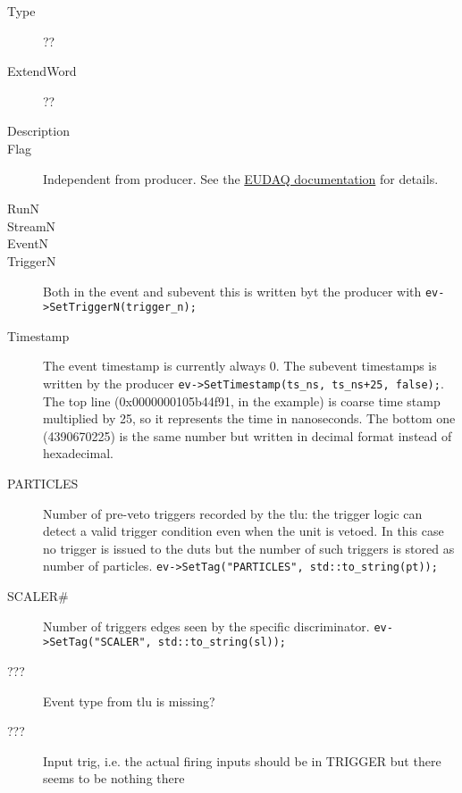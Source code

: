 \begin{description}
  \item[Type] ??
  \item[ExtendWord] ??
  \item[Description]
  \item[Flag] Independent from producer. See the \href{https://github.com/eudaq/eudaq/blob/master/main/lib/core/include/eudaq/Event.hh#L87}{EUDAQ documentation} for details.
  \item[RunN]
  \item[StreamN]
  \item[EventN]
  \item[TriggerN] Both in the event and subevent this is written byt the producer with \verb|ev->SetTriggerN(trigger_n);|
  \item[Timestamp] The event timestamp is currently always 0. The subevent timestamps is written by the producer \verb|ev->SetTimestamp(ts_ns, ts_ns+25, false);|. The top line (0x0000000105b44f91, in the example) is coarse time stamp multiplied by 25, so it represents the time in nanoseconds. The bottom one (4390670225) is the same number but written in decimal format instead of hexadecimal.
  \item[PARTICLES] Number of pre-veto triggers recorded by the \gls{tlu}: the trigger logic can detect a valid trigger condition even when the unit is vetoed. In this case no trigger is issued to the \gls{dut}s but the number of such triggers is stored as number of particles. \verb|ev->SetTag("PARTICLES", std::to_string(pt));|
  \item[SCALER\#] Number of triggers edges seen by the specific discriminator. \verb|ev->SetTag("SCALER", std::to_string(sl));|
  \item[???] Event type from \gls{tlu} is missing?
  \item[???] Input trig, i.e. the actual firing inputs should be in TRIGGER but there seems to be nothing there
\end{description}
